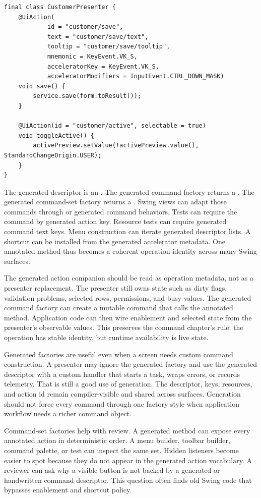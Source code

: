 \begin{lstlisting}[caption={Annotated presenter actions.}]
final class CustomerPresenter {
    @UiAction(
            id = "customer/save",
            text = "customer/save/text",
            tooltip = "customer/save/tooltip",
            mnemonic = KeyEvent.VK_S,
            acceleratorKey = KeyEvent.VK_S,
            acceleratorModifiers = InputEvent.CTRL_DOWN_MASK)
    void save() {
        service.save(form.toResult());
    }

    @UiAction(id = "customer/active", selectable = true)
    void toggleActive() {
        activePreview.setValue(!activePreview.value(), StandardChangeOrigin.USER);
    }
}
\end{lstlisting}

The generated descriptor is an . The generated command
factory returns a . The generated command-set factory
returns a . Swing views can adapt those commands through
 or generated command behaviors. Tests can require the
command by generated action key. Resource tests can require generated command
text keys. Menu construction can iterate generated descriptor lists. A
shortcut can be installed from the generated accelerator metadata. One
annotated method thus becomes a coherent operation identity across many Swing
surfaces.

The generated action companion should be read as operation metadata, not as a
presenter replacement. The presenter still owns state such as dirty flags,
validation problems, selected rows, permissions, and busy values. The
generated command factory can create a mutable command that calls the annotated
method. Application code can then wire enablement and selected state from the
presenter's observable values. This preserves the command chapter's rule: the
operation has stable identity, but runtime availability is live state.

Generated factories are useful even when a screen needs custom command
construction. A presenter may ignore the generated factory and use the
generated descriptor with a custom handler that starts a task, wraps errors,
or records telemetry. That is still a good use of generation. The descriptor,
keys, resources, and action id remain compiler-visible and shared across
surfaces. Generation should not force every command through one factory style
when application workflow needs a richer command object.

Command-set factories help with review. A generated 
method can expose every annotated action in deterministic order. A menu
builder, toolbar builder, command palette, or test can inspect the same set.
Hidden listeners become easier to spot because they do not appear in the
generated action vocabulary. A reviewer can ask why a visible button is not
backed by a generated or handwritten command descriptor. This question often
finds old Swing code that bypasses enablement and shortcut policy.

